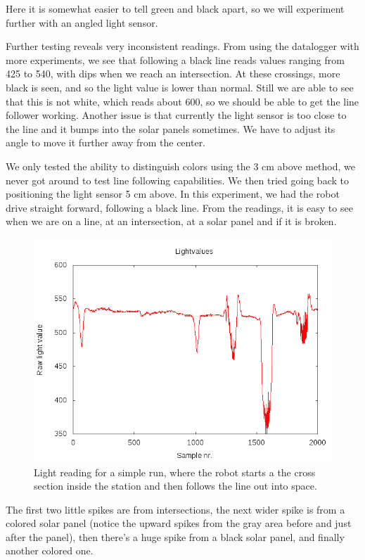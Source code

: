 Here
it is somewhat easier to tell green and black apart, so we will
experiment further with an angled light sensor.

Further testing reveals very inconsistent readings. From using the
datalogger with more experiments, we see that following a black line
reads values ranging from 425 to 540, with dips when we reach an
intersection. At these crossings, more black is seen, and so the light
value is lower than normal. Still we are able to see that this is not
white, which reads about 600, so we should be able to get the line
follower working. Another issue is that currently the light sensor is
too close to the line and it bumps into the solar panels sometimes. We
have to adjust its angle to move it further away from the center.

We only tested the ability to distinguish colors using the 3 cm above
method, we never got around to test line following capabilities. We then
tried going back to positioning the light sensor 5 cm above. In this
experiment, we had the robot drive straight forward, following a black
line. From the readings, it is easy to see when we are on a line, at an
intersection, at a solar panel and if it is
broken.
\begin{figure}[hbt]
  \centering
  \includegraphics[scale=0.5]{../experiments/1prototype/results/gnuplot/GridAccuracyFollowBlack3cm.png}
  \caption{Light reading for a simple run, where the robot starts a the cross section inside the station and then follows the line out into space.}
\end{figure}

The
first two little spikes are from intersections, the next wider spike is
from a colored solar panel (notice the upward spikes from the gray area
before and just after the panel), then there's a huge spike from a black
solar panel, and finally another colored one.

